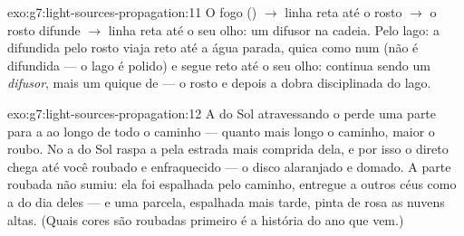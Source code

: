 \begin{solution}{exo:g7:light-sources-propagation:11}
O fogo () $\to$ linha reta até o rosto $\to$ o rosto
difunde $\to$ linha reta até o seu olho: um difusor na cadeia. Pelo
lago: a  difundida pelo rosto viaja reto até a água parada, quica
como num  (não é difundida --- o lago é polido) e segue reto
até o seu olho: continua sendo um \emph{difusor}, mais um quique de
 --- o rosto e depois a dobra disciplinada do lago.
\end{solution}

\begin{solution}{exo:g7:light-sources-propagation:12}
A  do Sol atravessando o  perde uma parte para a  ao
longo de todo o caminho --- quanto mais longo o caminho, maior o
roubo. No  a  do Sol raspa a  pela estrada mais
comprida dela, e por isso o  direto chega até você roubado e
enfraquecido --- o disco alaranjado e domado. A parte roubada não
sumiu: ela foi espalhada pelo caminho, entregue a outros céus como a
 do dia deles --- e uma parcela, espalhada mais tarde, pinta de
rosa as nuvens altas. (Quais cores são roubadas primeiro é a história
do ano que vem.)
\end{solution}

